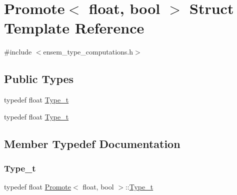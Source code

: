 \hypertarget{structPromote_3_01float_00_01bool_01_4}{}\section{Promote$<$ float, bool $>$ Struct Template Reference}
\label{structPromote_3_01float_00_01bool_01_4}


{\ttfamily \#include $<$ensem\+\_\+type\+\_\+computations.\+h$>$}

\subsection*{Public Types}
\begin{DoxyCompactItemize}
\item 
typedef float \mbox{\hyperlink{structPromote_3_01float_00_01bool_01_4_a4a81b15631e324d8d2dade1c48484b63}{Type\+\_\+t}}
\item 
typedef float \mbox{\hyperlink{structPromote_3_01float_00_01bool_01_4_a4a81b15631e324d8d2dade1c48484b63}{Type\+\_\+t}}
\end{DoxyCompactItemize}


\subsection{Member Typedef Documentation}
\mbox{\label{structPromote_3_01float_00_01bool_01_4_a4a81b15631e324d8d2dade1c48484b63}} 
\subsubsection{\texorpdfstring{Type\_t}{Type\_t}\hspace{0.1cm}{\footnotesize\ttfamily [1/2]}}
{\footnotesize\ttfamily typedef float \mbox{\hyperlink{structPromote}{Promote}}$<$ float, bool $>$\+::\mbox{\hyperlink{structPromote_3_01float_00_01bool_01_4_a4a81b15631e324d8d2dade1c48484b63}{Type\+\_\+t}}}

\mbox{\label{structPromote_3_01float_00_01bool_01_4_a4a81b15631e324d8d2dade1c48484b63}} 
